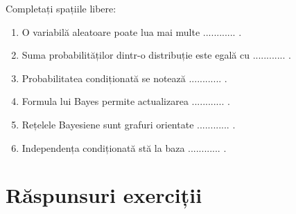 \documentclass[12pt,a4paper]{article}
\begin{document}
Completați spațiile libere:

\begin{enumerate}
\item O variabilă aleatoare poate lua mai multe ............ .
\item Suma probabilităților dintr-o distribuție este egală cu ............ .
\item Probabilitatea condiționată se notează ............ .
\item Formula lui Bayes permite actualizarea ............ .
\item Rețelele Bayesiene sunt grafuri orientate ............ .
\item Independența condiționată stă la baza ............ .
\end{enumerate}

\section{Răspunsuri exerciții}
\end{document}

